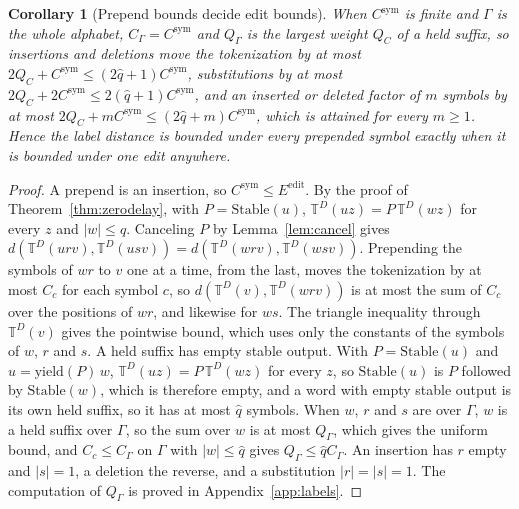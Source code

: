 \documentclass[11pt,a4paper]{article}
\theoremstyle{definition}
\theoremstyle{plain}
\newtheorem{corollary}{Corollary}
\newcommand{\T}{\mathbb{T}}
\newcommand{\yield}{\mathrm{yield}}
\newcommand{\Stable}{\mathrm{Stable}}
\newcommand{\Csym}{C^{\mathrm{sym}}}
\newcommand{\Eedit}{E^{\mathrm{edit}}}
\begin{document}
\begin{corollary}[Prepend bounds decide edit bounds]
When \(\Csym\) is finite and \(\Gamma\) is the whole alphabet, \(C_\Gamma = \Csym\) and \(Q_\Gamma\) is the largest
weight \(Q_C\) of a held suffix, so insertions and deletions move the tokenization by at most
\(2Q_C + \Csym \le (2\hat{q} + 1)\Csym\), substitutions by at most \(2Q_C + 2\Csym \le 2(\hat{q} + 1)\Csym\), and an
inserted or deleted factor of \(m\) symbols by at most \(2Q_C + m\Csym \le (2\hat{q} + m)\Csym\), which is attained for
every \(m \ge 1\). Hence the label distance is bounded under every prepended symbol exactly when it is bounded under one
edit anywhere.
\end{corollary}

\begin{proof}
A prepend is an insertion, so \(\Csym \le \Eedit\). By the proof of Theorem~\ref{thm:zerodelay}, with
\(P = \Stable(u)\), \(\T^D(uz) = P\,\T^D(wz)\) for every \(z\) and \(|w| \le \hat{q}\). Canceling \(P\) by
Lemma~\ref{lem:cancel} gives \(d(\T^D(urv), \T^D(usv)) = d(\T^D(wrv), \T^D(wsv))\). Prepending the symbols of \(wr\) to
\(v\) one at a time, from the last, moves the tokenization by at most \(C_c\) for each symbol \(c\), so
\(d(\T^D(v), \T^D(wrv))\) is at most the sum of \(C_c\) over the positions of \(wr\), and likewise for \(ws\). The
triangle inequality through \(\T^D(v)\) gives the pointwise bound, which uses only the constants of the symbols of
\(w\), \(r\) and \(s\). A held suffix has empty stable output. With \(P = \Stable(u)\) and \(u = \yield(P)\,w\),
\(\T^D(uz) = P\,\T^D(wz)\) for every \(z\), so \(\Stable(u)\) is \(P\) followed by \(\Stable(w)\), which is therefore
empty, and a word with empty stable output is its own held suffix, so it has at most \(\hat{q}\) symbols. When \(w\),
\(r\) and \(s\) are over \(\Gamma\), \(w\) is a held suffix over \(\Gamma\), so the sum over \(w\) is at most
\(Q_\Gamma\), which gives the uniform bound, and \(C_c \le C_\Gamma\) on \(\Gamma\) with \(|w| \le \hat{q}\) gives
\(Q_\Gamma \le \hat{q}C_\Gamma\). An insertion has \(r\) empty and \(|s| = 1\), a deletion the reverse, and a
substitution \(|r| = |s| = 1\). The computation of \(Q_\Gamma\) is proved in Appendix~\ref{app:labels}.


\end{proof}
\end{document}
